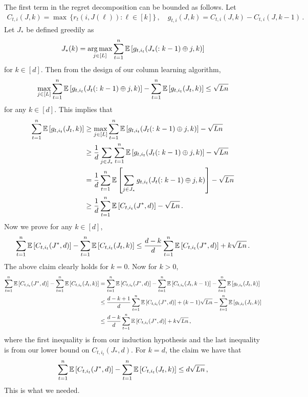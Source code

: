 The first term in the regret decomposition can be bounded as follows. Let
\begin{align*}
  C_{t, i}(J, k) =
  \max \, \{r_t(i, J(\ell)): \ell \in [k]\}\,, \quad
  g_{t, i}(J, k) =
  C_{t, i}(J, k) -   C_{t, i}(J, k - 1)\,.
\end{align*}
Let $J_\ast$ be defined greedily as
\begin{align*}
  J_\ast(k) =
  \mathop{\rm arg\,max}_{j \in [L]} \sum_{t = 1}^n \mathbb{E}\left[g_{t, i_t}(J_\ast(: k - 1) \oplus j, k)\right]
\end{align*}
for $k \in [d]$. Then from the design of our column learning algorithm,
\begin{align*}
  \max_{j \in [L]} \sum_{t = 1}^n \mathbb{E}\left[g_{t, i_t}(J_t(: k - 1) \oplus j, k)\right] -
  \sum_{t = 1}^n \mathbb{E}\left[g_{t, i_t}(J_t, k)\right] \leq
  \sqrt{L n}
\end{align*}
for any $k \in [d]$. This implies that
\begin{align*}
  \sum_{t = 1}^n \mathbb{E}\left[g_{t, i_t}(J_t, k)\right]
  & \geq \max_{j \in [L]} \sum_{t = 1}^n \mathbb{E}\left[g_{t, i_t}(J_t(: k - 1) \oplus j, k)\right] - \sqrt{L n} \\
  & \geq \frac{1}{d} \sum_{j \in J_\ast} \sum_{t = 1}^n \mathbb{E}\left[g_{t, i_t}(J_t(: k - 1) \oplus j, k)\right] - \sqrt{L n} \\
  & = \frac{1}{d} \sum_{t = 1}^n \mathbb{E}\left[\sum_{j \in J_\ast} g_{t, i_t}(J_t(: k - 1) \oplus j, k)\right] - \sqrt{L n} \\
  & \geq \frac{1}{d} \sum_{t = 1}^n \mathbb{E}\left[C_{t, i_t}(J^\ast, d)\right] - \sqrt{L n}\,.
\end{align*}
 Now we prove for any $k \in [d]$,
\begin{align*}
  \sum_{t = 1}^n \mathbb{E}\left[C_{t, i_t}(J^\ast, d)\right] - \sum_{t = 1}^n \mathbb{E}\left[C_{t, i_t}(J_t, k)\right] \leq
  \frac{d - k}{d} \sum_{t = 1}^n \mathbb{E}\left[C_{t, i_t}(J^\ast, d)\right] + k \sqrt{L n}\,.
\end{align*}
The above claim clearly holds for $k = 0$. Now for $k > 0$,
\begin{align*}
  \sum_{t = 1}^n \mathbb{E}\left[C_{t, i_t}(J^\ast, d)\right] - \sum_{t = 1}^n \mathbb{E}\left[C_{t, i_t}(J_t, k)\right]
  & = \sum_{t = 1}^n \mathbb{E}\left[C_{t, i_t}(J^\ast, d)\right] - \sum_{t = 1}^n \mathbb{E}\left[C_{t, i_t}(J_t, k - 1)\right] -
  \sum_{t = 1}^n \mathbb{E}\left[g_{t, i_t}(J_t, k)\right] \\
  & \leq \frac{d - k + 1}{d} \sum_{t = 1}^n \mathbb{E}\left[C_{t, i_t}(J^\ast, d)\right] + (k - 1) \sqrt{L n} -
  \sum_{t = 1}^n \mathbb{E}\left[g_{t, i_t}(J_t, k)\right] \\
  & \leq \frac{d - k}{d} \sum_{t = 1}^n \mathbb{E}\left[C_{t, i_t}(J^\ast, d)\right] + k \sqrt{L n}\,,
\end{align*}
where the first inequality is from our induction hypothesis and the last inequality is from our lower bound on $C_{t, i_t}(J_\ast, d)$. For $k = d$, the claim we have that
\begin{align*}
  \sum_{t = 1}^n \mathbb{E}\left[C_{t, i_t}(J^\ast, d)\right] - \sum_{t = 1}^n \mathbb{E}\left[C_{t, i_t}(J_t, k)\right] \leq
  d \sqrt{L n}\,,
\end{align*}
This is what we needed.

